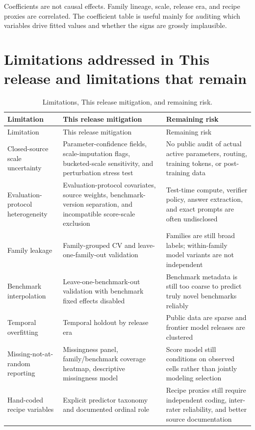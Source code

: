 \documentclass[11pt]{article}
\begin{document}
\begin{table}[H]
\centering\scriptsize
\caption{Largest standardized coefficients from the canonical full ridge model. Coefficients are descriptive because predictors are correlated and regularized.}
\resizebox{\textwidth}{!}{\VSixCoefficientTable}
\label{tab:coefficients}
\end{table}

Coefficients are not causal effects.  Family lineage, scale, release era, and recipe proxies are correlated.  The coefficient table is useful mainly for auditing which variables drive fitted values and whether the signs are grossly implausible.

\section{Limitations addressed in This release and limitations that remain}
\begin{longtable}{p{}p{}p{}}
\caption{Limitations, This release mitigation, and remaining risk.}\\
\toprule
Limitation & This release mitigation & Remaining risk \\
\midrule
\endfirsthead
\toprule
Limitation & This release mitigation & Remaining risk \\
\midrule
\endhead
Closed-source scale uncertainty & Parameter-confidence fields, scale-imputation flags, bucketed-scale sensitivity, and perturbation stress test & No public audit of actual active parameters, routing, training tokens, or post-training data \\
Evaluation-protocol heterogeneity & Evaluation-protocol covariates, source weights, benchmark-version separation, and incompatible score-scale exclusion & Test-time compute, verifier policy, answer extraction, and exact prompts are often undisclosed \\
Family leakage & Family-grouped CV and leave-one-family-out validation & Families are still broad labels; within-family model variants are not independent \\
Benchmark interpolation & Leave-one-benchmark-out validation with benchmark fixed effects disabled & Benchmark metadata is still too coarse to predict truly novel benchmarks reliably \\
Temporal overfitting & Temporal holdout by release era & Public data are sparse and frontier model releases are clustered \\
Missing-not-at-random reporting & Missingness panel, family/benchmark coverage heatmap, descriptive missingness model & Score model still conditions on observed cells rather than jointly modeling selection \\
Hand-coded recipe variables & Explicit predictor taxonomy and documented ordinal role & Recipe proxies still require independent coding, inter-rater reliability, and better source documentation \\
\bottomrule
\end{longtable}
\end{document}

